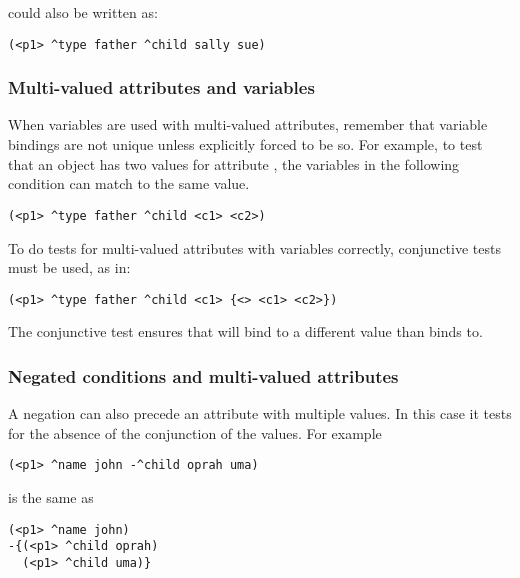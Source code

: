 could also be written as:

\begin{verbatim}
(<p1> ^type father ^child sally sue)
\end{verbatim}


\subsubsection*{Multi-valued attributes and variables}

When variables are used with multi-valued attributes, remember that variable bindings are not unique unless explicitly forced to be so. For example, to test that an object has two values for attribute , the variables in the following condition can match to the same value.

\begin{verbatim}
(<p1> ^type father ^child <c1> <c2>)
\end{verbatim} 
\vspace{12pt}

To do tests for multi-valued attributes with variables correctly, conjunctive tests must be used, as in:

\begin{verbatim}
(<p1> ^type father ^child <c1> {<> <c1> <c2>})
\end{verbatim} 

The conjunctive test  ensures that  will bind to a different value than  binds to.


\subsubsection*{Negated conditions and multi-valued attributes}

A negation can also precede an attribute with multiple values.  In this case it tests for the absence of the conjunction of the values.  For example

\begin{verbatim}
(<p1> ^name john -^child oprah uma)
\end{verbatim}

is the same as 

\begin{verbatim}
(<p1> ^name john)
-{(<p1> ^child oprah)
  (<p1> ^child uma)}
\end{verbatim}


